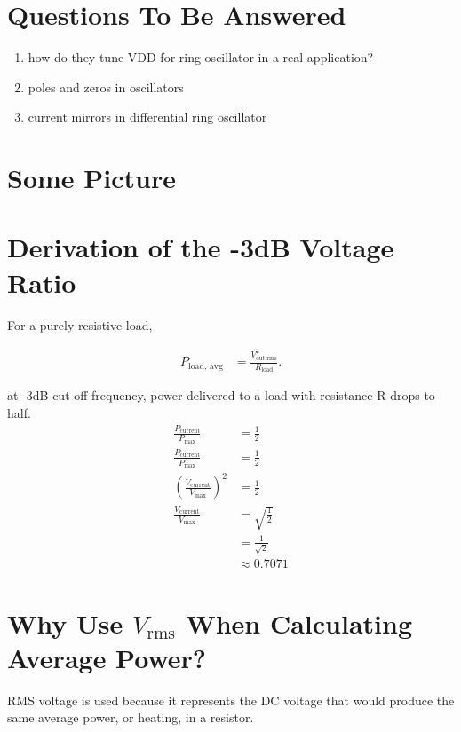 \documentclass{article}
\begin{document}
\section{Questions To Be Answered}
    \begin{enumerate}
        \item how do they tune VDD for ring oscillator in a real application?
        \item poles and zeros in oscillators
        \item current mirrors in differential ring oscillator
    \end{enumerate}
\section{Some Picture}

\appendix

\section{Derivation of the -3dB Voltage Ratio}
\label{app:minus-3db}
    For a purely resistive load,

    \begin{align*}
        P_{\text{load, avg}}
        &= \frac{V_{\text{out,rms}}^2}{R_{\text{load}}}.
    \end{align*}

    at -3dB cut off frequency, power delivered to a load with resistance R drops to half.
    \begin{align*}
        \frac{P_{\mathrm{current}}}{P_{\mathrm{max}}}&= \frac{1}{2} \\
        \frac{P_{\mathrm{current}}}{P_{\mathrm{max}}}&= \frac{1}{2} \\
        \left(\frac{V_{\mathrm{current}}}{V_{\mathrm{max}}}\right)^2&= \frac{1}{2} \\
        \frac{V_{\mathrm{current}}}{V_{\mathrm{max}}}&= \sqrt{\frac{1}{2}} \\
            &= \frac{1}{\sqrt{2}} \\
            &\approx 0.7071
    \end{align*}

\section{Why Use $V_{\mathrm{rms}}$ When Calculating Average Power?}
\label{app:why_vrms}
    RMS voltage is used because it represents the DC voltage that would
    produce the same average power, or heating, in a resistor.
\end{document}
